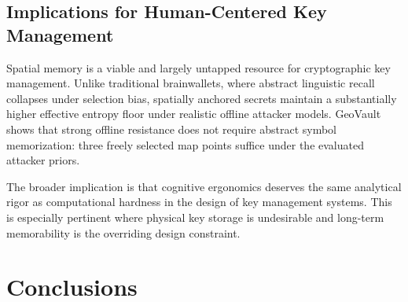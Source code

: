 \documentclass[mathematics,article,accept,pdftex,moreauthors]{Definitions/mdpi}
\begin{document}
\subsection{Implications for Human-Centered Key Management}


{Spatial memory is a viable and largely untapped resource for cryptographic key management. Unlike traditional brainwallets, where abstract linguistic recall collapses under selection bias, spatially anchored secrets maintain a substantially higher effective entropy floor under realistic offline attacker models. GeoVault shows that strong offline resistance does not require abstract symbol memorization: three freely selected map points suffice under the evaluated attacker priors.}

{The broader implication is that cognitive ergonomics deserves the same analytical rigor as computational hardness in the design of key management systems. This is especially pertinent where physical key storage is undesirable and long-term memorability is the overriding design constraint.}

\section{Conclusions\label{sec7}}
\end{document}
